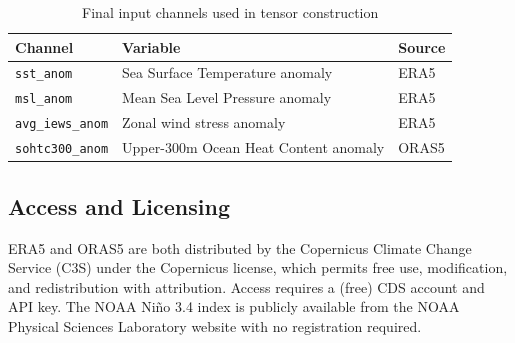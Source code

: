 \begin{table}[H]
\centering
\caption{Final input channels used in tensor construction}
\label{tab:dataset_channels}
\normalsize
\renewcommand{\arraystretch}{1.2}
\begin{tabular}{|l|l|l|}
\hline
\textbf{Channel} & \textbf{Variable} & \textbf{Source} \\
\hline
\texttt{sst\_anom} & Sea Surface Temperature anomaly & ERA5 \\
\hline
\texttt{msl\_anom} & Mean Sea Level Pressure anomaly & ERA5 \\
\hline
\texttt{avg\_iews\_anom} & Zonal wind stress anomaly & ERA5 \\
\hline
\texttt{sohtc300\_anom} & Upper-300m Ocean Heat Content anomaly & ORAS5 \\
\hline
\end{tabular}
\end{table}

\subsection*{Access and Licensing}
ERA5 and ORAS5 are both distributed by the Copernicus Climate Change Service (C3S) under the Copernicus license, which permits free use, modification, and redistribution with attribution. Access requires a (free) CDS account and API key. The NOAA Ni\~{n}o 3.4 index is publicly available from the NOAA Physical Sciences Laboratory website with no registration required.